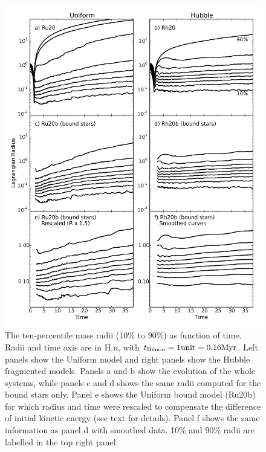 

\begin{figure}
\begin{center}
\includegraphics[width=\textwidth]{Figures/3_Lagr_radius}
\caption{The ten-percentile mass radii (10\% to 90\%) as function of time. Radii and time axis are in H.u, with $t_{\textrm{H\'enon}} = 1 {\rm unit} =  0.16 {\textrm{Myr}}$. Left panels show the Uniform model and right panels show the Hubble fragmented models. Panels a and b show the evolution of the whole systems, while panels c and d shows the same radii computed for the bound stars only. Panel e shows the Uniform bound model (Ru20b) for which radius and time were rescaled to compensate the difference of initial kinetic energy (see text for details). Panel f shows the same information as panel d with smoothed data. 10\% and 90\% radii are labelled in the top right panel.
}
\label{Fig:3_Lagr_radius}
\end{center}
\end{figure}


